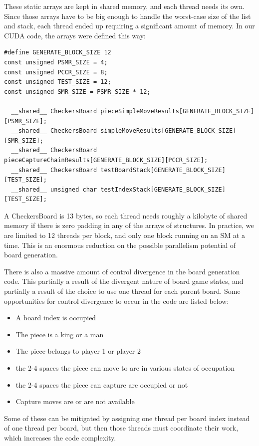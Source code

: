 \documentclass[11pt]{article}
\begin{document}
These static arrays are kept in shared memory, and each thread needs its own.
Since those arrays have to be big enough to handle the worst-case size of the 
list and stack, each thread ended up requiring a significant amount of memory.
In our CUDA code, the arrays were defined this way:

\begin{lstlisting}
#define GENERATE_BLOCK_SIZE 12
const unsigned PSMR_SIZE = 4;
const unsigned PCCR_SIZE = 8;
const unsigned TEST_SIZE = 12;
const unsigned SMR_SIZE = PSMR_SIZE * 12;

  __shared__ CheckersBoard pieceSimpleMoveResults[GENERATE_BLOCK_SIZE][PSMR_SIZE];
  __shared__ CheckersBoard simpleMoveResults[GENERATE_BLOCK_SIZE][SMR_SIZE];
  __shared__ CheckersBoard pieceCaptureChainResults[GENERATE_BLOCK_SIZE][PCCR_SIZE];
  __shared__ CheckersBoard testBoardStack[GENERATE_BLOCK_SIZE][TEST_SIZE];
  __shared__ unsigned char testIndexStack[GENERATE_BLOCK_SIZE][TEST_SIZE];
\end{lstlisting}

A CheckersBoard is 13 bytes, so each thread needs roughly a kilobyte of shared
memory if there is zero padding in any of the arrays of structures. In practice,
we are limited to 12 threads per block, and only one block running on an SM at
a time. This is an enormous reduction on the possible parallelism potential of
board generation.

There is also a massive amount of control divergence in the board generation
code. This partially a result of the divergent nature of board game states, and
partially a result of the choice to use one thread for each parent board. Some
opportunities for control divergence to occur in the code are listed below:

\begin{itemize}
  \item{A board index is occupied}
  \item{The piece is a king or a man}
  \item{The piece belongs to player 1 or player 2}
  \item{the 2-4 spaces the piece can move to are in various states of occupation}
  \item{the 2-4 spaces the piece can capture are occupied or not}
  \item{Capture moves are or are not available}
\end{itemize}

Some of these can be mitigated by assigning one thread per board index instead
of one thread per board, but then those threads must coordinate their work,
which increases the code complexity.
\end{document}
